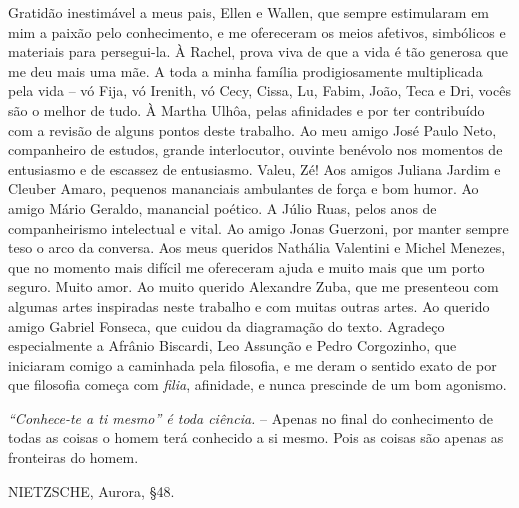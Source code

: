 \documentclass[
	12pt,				%
	openright,			%
	oneside,			%
	a4paper,			%
	english,			%
	french,				%
	spanish,			%
	brazil				%
	]{abntex2}
\begin{document}
\begin{agradecimentos}
	Gratidão inestimável a meus pais, Ellen e Wallen, que sempre estimularam em mim a paixão pelo conhecimento, e me ofereceram os meios afetivos, simbólicos e materiais para persegui-la. À Rachel, prova viva de que a vida é tão generosa que me deu mais uma mãe. A toda a minha família prodigiosamente multiplicada pela vida – vó Fija, vó Irenith, vó Cecy, Cissa, Lu, Fabim, João, Teca e Dri, vocês são o melhor de tudo. À Martha Ulhôa, pelas afinidades e por ter contribuído com a revisão de alguns pontos deste trabalho. Ao meu amigo José Paulo Neto, companheiro de estudos, grande interlocutor, ouvinte benévolo nos momentos de entusiasmo e de escassez de entusiasmo. Valeu, Zé! Aos amigos Juliana Jardim e Cleuber Amaro, pequenos mananciais ambulantes de força e bom humor. Ao amigo Mário Geraldo, manancial poético. A Júlio Ruas, pelos anos de companheirismo intelectual e vital. Ao amigo Jonas Guerzoni, por manter sempre teso o arco da conversa. Aos meus queridos Nathália Valentini e Michel Menezes, que no momento mais difícil me ofereceram ajuda e muito mais que um porto seguro. Muito amor. Ao muito querido Alexandre Zuba, que me presenteou com algumas artes inspiradas neste trabalho e com muitas outras artes. Ao querido amigo Gabriel Fonseca, que cuidou da diagramação do texto. Agradeço especialmente a Afrânio Biscardi, Leo Assunção e Pedro Corgozinho, que iniciaram comigo a caminhada pela filosofia, e me deram o sentido exato de por que filosofia começa com \textit{filia}, afinidade, e nunca prescinde de um bom agonismo.

\end{agradecimentos}

\begin{epigrafe}
    \vspace*{\fill}
    \hfill
    \begin{minipage}{.7\textwidth}
	\begin{flushright}
\textit{“Conhece-te a ti mesmo” é toda ciência.} -- Apenas no final do conhecimento de todas as coisas o homem terá conhecido a si mesmo. Pois as coisas são apenas as fronteiras do homem. 

NIETZSCHE, Aurora, §48.
	\end{flushright}
    \end{minipage}
\end{epigrafe}

\end{document}
